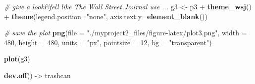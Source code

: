 \documentclass[12pt,spanish, american,b4paper, onecolumn, lmargin=1cm, rmargin=1cm, tmargin=1cm, bmargin=2cm,]{article}
\newenvironment{Shaded}{}{}
\newcommand{\KeywordTok}[1]{\textbf{{#1}}}
\newcommand{\DataTypeTok}[1]{\textcolor[rgb]{0.50,0.00,0.00}{{#1}}}
\newcommand{\DecValTok}[1]{\textcolor[rgb]{0.00,0.00,1.00}{{#1}}}
\newcommand{\StringTok}[1]{\textcolor[rgb]{0.87,0.00,0.00}{{#1}}}
\newcommand{\CommentTok}[1]{\textcolor[rgb]{0.50,0.50,0.50}{\textit{{#1}}}}
\newcommand{\NormalTok}[1]{{#1}}
\begin{document}
\begin{Shaded}
\begin{Highlighting}[]
\CommentTok{# give a look&fell like The Wall Street Journal use ... }
\NormalTok{g3 <-}\StringTok{ }\NormalTok{p3 +}\StringTok{ }
\StringTok{  }\KeywordTok{theme_wsj}\NormalTok{() +}
\StringTok{  }\KeywordTok{theme}\NormalTok{(}\DataTypeTok{legend.position=}\StringTok{"none"}\NormalTok{, }\DataTypeTok{axis.text.y=}\KeywordTok{element_blank}\NormalTok{())}

\CommentTok{# save the plot }
\KeywordTok{png}\NormalTok{(}\DataTypeTok{file =} \StringTok{"./myproject2_files/figure-latex/plot3.png"}\NormalTok{, }
    \DataTypeTok{width =} \DecValTok{480}\NormalTok{, }
    \DataTypeTok{height =} \DecValTok{480}\NormalTok{, }
    \DataTypeTok{units =} \StringTok{"px"}\NormalTok{, }
    \DataTypeTok{pointsize =} \DecValTok{12}\NormalTok{,}
    \DataTypeTok{bg =} \StringTok{"transparent"}\NormalTok{)}

\KeywordTok{plot}\NormalTok{(g3)}

\KeywordTok{dev.off}\NormalTok{() ->}\StringTok{ }\NormalTok{trashcan}
\end{Highlighting}
\end{Shaded}
\end{document}
